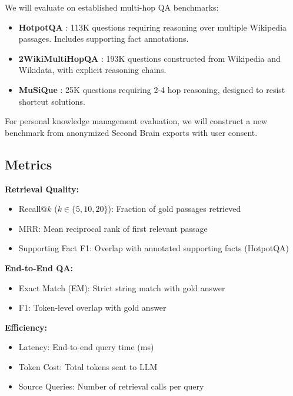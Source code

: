 \documentclass[11pt,a4paper]{article}
\begin{document}
We will evaluate on established multi-hop QA benchmarks:

\begin{itemize}
    \item \textbf{HotpotQA} \citep{yang2018hotpotqa}: 113K questions requiring reasoning over multiple Wikipedia passages. Includes supporting fact annotations.
    
    \item \textbf{2WikiMultiHopQA} \citep{ho2020constructing}: 193K questions constructed from Wikipedia and Wikidata, with explicit reasoning chains.
    
    \item \textbf{MuSiQue} \citep{trivedi2022musique}: 25K questions requiring 2-4 hop reasoning, designed to resist shortcut solutions.
\end{itemize}

For personal knowledge management evaluation, we will construct a new benchmark from anonymized Second Brain exports with user consent.

\subsection{Metrics}

\textbf{Retrieval Quality:}
\begin{itemize}
    \item Recall@$k$ ($k \in \{5, 10, 20\}$): Fraction of gold passages retrieved
    \item MRR: Mean reciprocal rank of first relevant passage
    \item Supporting Fact F1: Overlap with annotated supporting facts (HotpotQA)
\end{itemize}

\textbf{End-to-End QA:}
\begin{itemize}
    \item Exact Match (EM): Strict string match with gold answer
    \item F1: Token-level overlap with gold answer
\end{itemize}

\textbf{Efficiency:}
\begin{itemize}
    \item Latency: End-to-end query time (ms)
    \item Token Cost: Total tokens sent to LLM
    \item Source Queries: Number of retrieval calls per query
\end{itemize}
\end{document}

